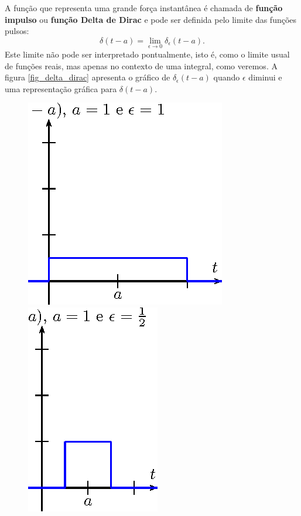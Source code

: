 A função que representa uma grande força instantânea é chamada de {\bf função impulso} ou {\bf função Delta de Dirac} e pode ser definida pelo limite das funções pulsos:
\begin{equation}
\delta(t-a)=\lim_{\epsilon\to 0}\delta_\epsilon(t-a).
\end{equation}
Este limite não pode ser interpretado pontualmente, isto é, como o limite usual de funções reais, mas apenas no contexto de uma integral, como veremos.
A figura \ref{fig_delta_dirac} apresenta o gráfico de $\delta_\epsilon(t-a)$ quando $\epsilon$ diminui e uma representação gráfica para $\delta(t-a)$.
\begin{figure}[!ht]
\begin{center}

\includegraphics{cap_dirac_conv/pics/figura_1}\hspace{20pt}
\includegraphics{cap_dirac_conv/pics/figura_2}\hspace{20pt}

\end{center}
\end{figure}
